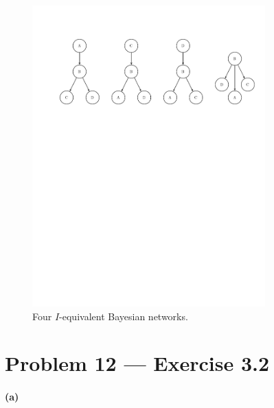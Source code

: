 \documentclass[11pt]{article}
\newcommand{\figlabel}[1]{\label{fig:#1}}
\begin{document}
\begin{figure}[hbtp]
    \centering
    \includegraphics[width=0.8\textwidth,%
        trim=1.9cm 18cm 0.8cm 3cm,clip=true]{gm/gm1.pdf}
    \caption{Four $I$-equivalent Bayesian networks. \figlabel{gm1}}
\end{figure}

\section{Problem 12 --- Exercise 3.2}

\paragraph{(a)}
\end{document}
